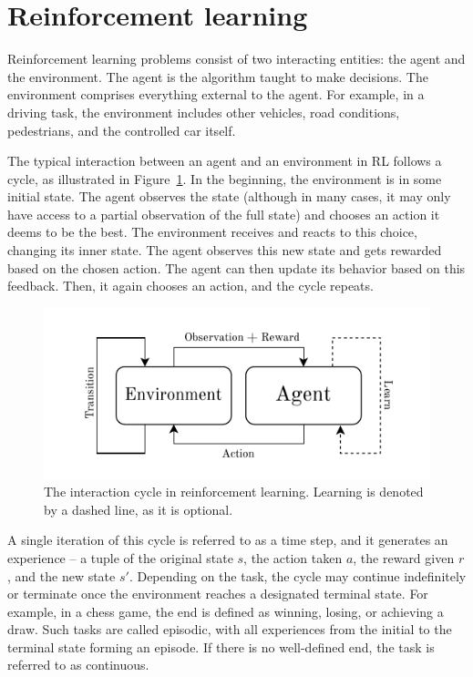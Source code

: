 \documentclass[
  digital,     %
  oneside,     %
  nosansbold,  %
  nocolorbold, %
  lof,         %
  lot,         %
]{fithesis4}
\begin{document}
\section{Reinforcement learning}
Reinforcement learning problems consist of two interacting entities: the agent and the environment. The agent is the algorithm taught to make decisions. The environment comprises everything external to the agent. For example, in a driving task, the environment includes other vehicles, road conditions, pedestrians, and the controlled car itself.

The typical interaction between an agent and an environment in RL follows a cycle, as illustrated in Figure~\ref{fig:rl-cycle}. In the beginning, the environment is in some initial state. The agent observes the state (although in many cases, it may only have access to a partial observation of the full state) and chooses an action it deems to be the best. The environment receives and reacts to this choice, changing its inner state. The agent observes this new state and gets rewarded based on the chosen action. The agent can then update its behavior based on this feedback. Then, it again chooses an action, and the cycle repeats.

\begin{figure}[h]
    \centering
    \includegraphics[width=1\linewidth]{diagrams/rl_cycle.pdf}
    \caption{The interaction cycle in reinforcement learning. Learning is denoted by a dashed line, as it is optional.}
    \label{fig:rl-cycle}
\end{figure}

A single iteration of this cycle is referred to as a time step, and it generates an experience -- a tuple of the original state $s$, the action taken $a$, the reward given $r$, and the new state $s'$. Depending on the task, the cycle may continue indefinitely or terminate once the environment reaches a designated terminal state. For example, in a chess game, the end is defined as winning, losing, or achieving a draw. Such tasks are called episodic, with all experiences from the initial to the terminal state forming an episode. If there is no well-defined end, the task is referred to as continuous.
\end{document}
